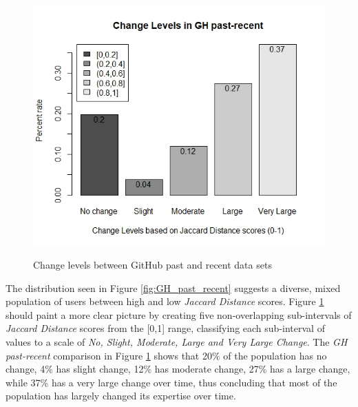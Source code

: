         \begin{figure}
          \centering
          \includegraphics[width=\textwidth]{figures/change_level_GH_past-recent.jpeg}\\
          \caption{Change levels between GitHub past and recent data sets}
          \label{fig:change_GH_past_recent}
        \end{figure}
        
        The distribution seen in Figure \ref{fig:GH_past_recent} suggests a diverse, mixed population of users between high and low \emph{Jaccard Distance} scores. Figure \ref{fig:change_GH_past_recent} should paint a more clear picture by creating five non-overlapping sub-intervals of \emph{Jaccard Distance} scores from the [0,1] range, classifying each sub-interval of values to a scale of \emph{No, Slight, Moderate, Large and Very Large Change}. The \emph{GH past-recent} comparison in Figure \ref{fig:change_GH_past_recent} shows that 20\% of the population has no change, 4\% has slight change, 12\% has moderate change, 27\% has a large change, while 37\% has a very large change over time, thus concluding that most of the population has largely changed its expertise over time.
        
